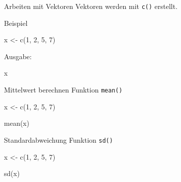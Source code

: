 \documentclass[
  10pt,
  ignorenonframetext,
  aspectratio=169,
]{beamer}
\newenvironment{Shaded}{}{}
\newcommand{\DecValTok}[1]{\textcolor[rgb]{0.25,0.63,0.44}{#1}}
\newcommand{\FunctionTok}[1]{\textcolor[rgb]{0.02,0.16,0.49}{#1}}
\newcommand{\NormalTok}[1]{#1}
\newcommand{\OtherTok}[1]{\textcolor[rgb]{0.00,0.44,0.13}{#1}}
\begin{document}
\begin{frame}[fragile]{Arbeiten mit Vektoren}
\label{arbeiten-mit-vektoren}
Vektoren werden mit \texttt{c()} erstellt.

Beispiel

\begin{Shaded}
\begin{Highlighting}[]
\NormalTok{x }\OtherTok{\textless{}{-}} \FunctionTok{c}\NormalTok{(}\DecValTok{1}\NormalTok{, }\DecValTok{2}\NormalTok{, }\DecValTok{5}\NormalTok{, }\DecValTok{7}\NormalTok{)}
\end{Highlighting}
\end{Shaded}

Ausgabe:

\begin{Shaded}
\begin{Highlighting}[]
\NormalTok{x}
\end{Highlighting}
\end{Shaded}
\end{frame}

\begin{frame}[fragile]{Mittelwert berechnen}
\label{mittelwert-berechnen}
Funktion \texttt{mean()}

\begin{Shaded}
\begin{Highlighting}[]
\NormalTok{x }\OtherTok{\textless{}{-}} \FunctionTok{c}\NormalTok{(}\DecValTok{1}\NormalTok{, }\DecValTok{2}\NormalTok{, }\DecValTok{5}\NormalTok{, }\DecValTok{7}\NormalTok{)}

\FunctionTok{mean}\NormalTok{(x)}
\end{Highlighting}
\end{Shaded}
\end{frame}

\begin{frame}[fragile]{Standardabweichung}
\label{standardabweichung}
Funktion \texttt{sd()}

\begin{Shaded}
\begin{Highlighting}[]
\NormalTok{x }\OtherTok{\textless{}{-}} \FunctionTok{c}\NormalTok{(}\DecValTok{1}\NormalTok{, }\DecValTok{2}\NormalTok{, }\DecValTok{5}\NormalTok{, }\DecValTok{7}\NormalTok{)}

\FunctionTok{sd}\NormalTok{(x)}
\end{Highlighting}
\end{Shaded}
\end{frame}
\end{document}
